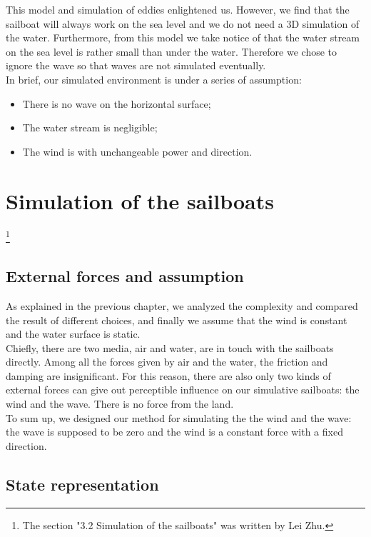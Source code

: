 \documentclass[a4paper]{report}
\begin{document}
This model and simulation of eddies enlightened us. However, we find that the sailboat will always work on the sea level and we do not need a 3D simulation of the water. Furthermore, from this model we take notice of that the water stream on the sea level is rather small than under the water. Therefore we chose to ignore the wave so that waves are not simulated eventually.\\

In brief, our simulated environment is under a series of assumption:
\begin{itemize}
\item There is no wave on the horizontal surface;
\item The water stream is negligible;
\item The wind is with unchangeable power and direction.
\end{itemize}


\section{Simulation of the sailboats}
\footnote{The section "3.2 Simulation of the sailboats" was written by Lei Zhu.}
\subsection{External forces and assumption}

As explained in the previous chapter, we analyzed the complexity and compared the result of different choices, and finally we assume that the wind is constant and the water surface is static.\\

Chiefly, there are two media, air and water, are in touch with the sailboats directly. Among all the forces given by air and the water, the friction and damping are insignificant. For this reason, there are also only two kinds of external forces can give out perceptible influence on our simulative sailboats: the wind and the wave. There is no force from the land. \\

To sum up, we designed our method for simulating the the wind and the wave: the wave is supposed to be zero and the wind is a constant force with a fixed direction.

\subsection{State representation}
\end{document}
